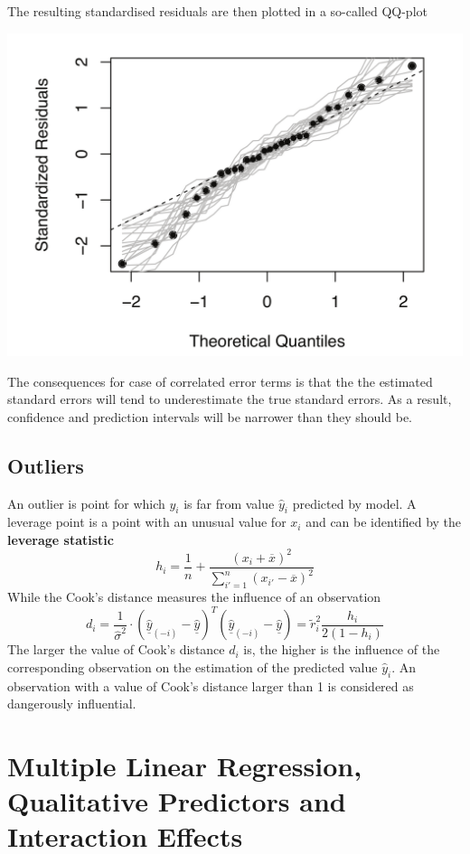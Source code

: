 \documentclass[11pt]{article}
\theoremstyle{definition}
\newcommand*\samplemean[1]{\overline{#1}}
\begin{document}
The resulting standardised residuals are then plotted in a so-called QQ-plot
\begin{center}
	\includegraphics[width=0.5\linewidth]{img/QQ_plot}
\end{center}
\begin{theorem}
	The consequences for case of correlated error terms is that the  the estimated standard errors will tend to underestimate the true standard errors. As a result, confidence and prediction intervals will be narrower than they should be.
\end{theorem}

\subsection{Outliers}
An outlier is point for which $y_i$ is far from value $\hat{y}_i$ predicted by model. A leverage point is a point with an unusual value for $x_i$ and can be identified by the \textbf{leverage statistic}
\begin{equation*}
	h_i = \frac{1}{n} + \frac{(x_i + \samplemean{x})^2}{\sum_{i' = 1}^{n}(x_{i'}-\samplemean{x})^2}
\end{equation*}
While the Cook's distance measures the influence of an observation
\begin{equation*}
	d_i = \frac{1}{\hat{\sigma}^2}\cdot\left(\underline{\hat{y}}_{(-i)} - \underline{\hat{y}}\right)^T \left(\underline{\hat{y}}_{(-i)} - \underline{\hat{y}}\right) = \tilde{r}_i^2 \frac{h_i}{2(1-h_i)}
\end{equation*}
The larger the value of Cook’s distance $d_i$ is, the higher is the influence of the corresponding observation on the estimation of the predicted value $\hat{y}_i$. An observation with a value of Cook’s distance larger than 1 is considered as dangerously influential.

\section{Multiple Linear Regression, Qualitative Predictors and Interaction Effects}
\end{document}
